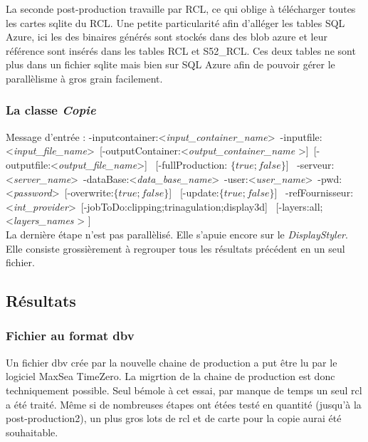 La seconde post-production travaille par RCL, ce qui oblige à
télécharger toutes les cartes sqlite du RCL. Une petite particularité
afin d'alléger les tables SQL Azure, ici les des binaires générés sont
stockés dans des blob azure et leur référence sont insérés dans les
tables RCL et S52\_RCL. Ces deux tables ne sont plus dans un fichier
sqlite mais bien sur SQL Azure afin de pouvoir gérer le parallèlisme à
gros grain facilement.

\subsubsection{La classe \textit{Copie}}
Message d'entrée : 
-inputcontainer:\textless \textit{input\_container\_name}\textgreater \   
-inputfile:\textless \textit{input\_file\_name}\textgreater \ 
[-outputContainer:\textless \textit{output\_container\_name} \textgreater ]\  
[-outputfile:\textless \textit{output\_file\_name}\textgreater ] \ 
[-fullProduction: $\{true;false\}$] \ 
-serveur:\textless \textit{server\_name}\textgreater \   
-dataBase:\textless \textit{data\_base\_name}\textgreater \   
-user:\textless \textit{user\_name}\textgreater  \ 
-pwd:\textless \textit{password}\textgreater  \ 
[-overwrite:$\{true;false\}$] \ 
[-update:$\{true;false\}$] \ 
-refFournisseur:\textless \textit{int\_provider}\textgreater \   
[-jobToDo:{clipping;trinagulation;display3d}] \ 
[-layers:{all;\textless \textit{layers\_names} \textgreater} ] \\

La dernière étape n'est pas parallèlisé. Elle s'apuie encore sur le
\textit{DisplayStyler}. Elle consiste grossièrement à regrouper tous
les résultats précédent en un seul fichier.




%
%

\subsection{Résultats}

\subsubsection{Fichier au format dbv}

Un fichier dbv crée par la nouvelle chaine de production a put être
lu par le logiciel MaxSea TimeZero. La migrtion de la chaine de
production est donc techniquement possible. Seul bémole à cet essai,
par manque de temps un seul rcl a été traité. Même si de nombreuses
étapes ont étées testé en quantité (jusqu'à la post-production2), un
plus gros lots de rcl et de carte pour la copie aurai été souhaitable.

